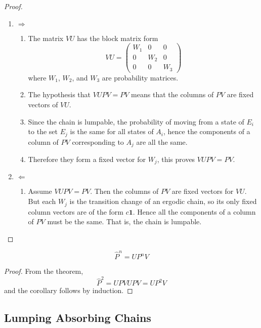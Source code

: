 \documentclass[12pt]{article}
\begin{document}
\begin{proof}
  \begin{enumerate}
  \item $\Rightarrow$
    \begin{enumerate}
    \item The matrix $VU$ has the block matrix form
      \[
        VU =
        \begin{pmatrix}
          W_1 & 0 & 0 \\
          0   & W_2 & 0 \\
          0   & 0   & W_3
        \end{pmatrix}
      \]
      where $W_1$, $W_2$, and $W_3$ are probability matrices.
    \item The hypothesis that \( VUPV = PV \) means that the columns
      of $PV$ are fixed vectors of $VU$.
    \item Since the chain is lumpable, the probability of moving from a
      state of $E_i$ to the set $E_j$ is the same for all states of
      $A_i$, hence the components of a column of $PV$ corresponding to
      $A_j$ are all the same.
    \item Therefore they form a fixed vector for $W_j$, this proves
      \(VUPV = PV \).
    \end{enumerate}
  \item $\Leftarrow$
    \begin{enumerate}
    \item Assume \(VUPV = PV \).  Then the columns of $PV$ are fixed
      vectors for $VU$.  But each $W_j$ is the transition change of an
      ergodic chain, so its only fixed column vectors are of the form
      $c \mathbf{1}$.  Hence all the components of a column of $PV$ must be
      the same.  That is, the chain is lumpable.
    \end{enumerate}
  \end{enumerate}
\end{proof}

\begin{corollary}
  \[
    \hat{P}^n = U P^n V
  \]
\end{corollary}

\begin{proof}
  From the theorem,
  \[
    \hat{P}^2 = U P V U P V = U P^2 V
  \]
  and the corollary follows by induction.
\end{proof}


\subsection*{Lumping Absorbing Chains}
\end{document}
